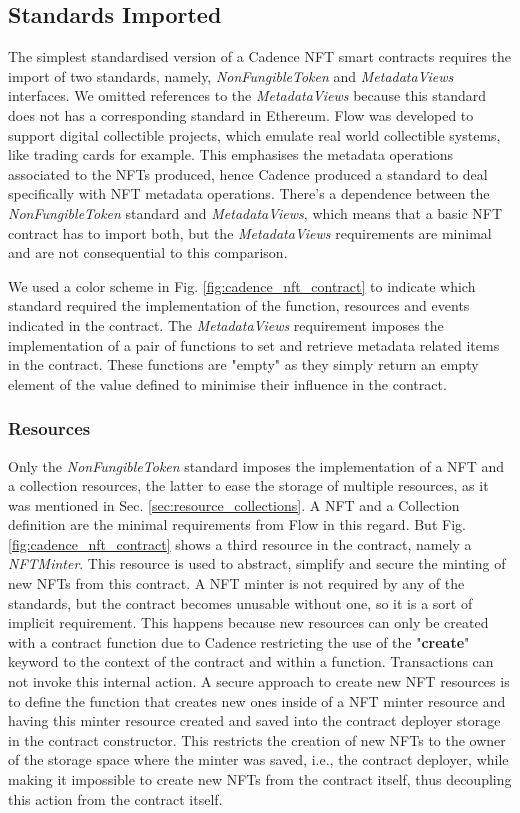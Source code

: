 \documentclass[../NFTComp_IEEE.tex]{subfiles}
\begin{document}
\subsection{Standards Imported}
The simplest standardised version of a Cadence NFT smart contracts requires the import of two standards, namely, \textit{NonFungibleToken} and \textit{MetadataViews} interfaces. We omitted references to the \textit{MetadataViews} because this standard does not has a corresponding standard in Ethereum. Flow was developed to support digital collectible projects, which emulate real world collectible systems, like trading cards for example. This emphasises the metadata operations associated to the NFTs produced, hence Cadence produced a standard to deal specifically with NFT metadata operations. There's a dependence between the \textit{NonFungibleToken} standard and \textit{MetadataViews}, which means that a basic NFT contract has to import both, but the \textit{MetadataViews} requirements are minimal and are not consequential to this comparison.
\par
We used a color scheme in Fig. \ref{fig:cadence_nft_contract} to indicate which standard required the implementation of the function, resources and events indicated in the contract. The \textit{MetadataViews} requirement imposes the implementation of a pair of functions to set and retrieve metadata related items in the contract. These functions are "empty" as they simply return an empty element of the value defined to minimise their influence in the contract.

\subsubsection{Resources}
Only the \textit{NonFungibleToken} standard imposes the implementation of a NFT and a collection resources, the latter to ease the storage of multiple resources, as it was mentioned in Sec. \ref{sec:resource_collections}. A NFT and a Collection definition are the minimal requirements from Flow in this regard. But Fig. \ref{fig:cadence_nft_contract} shows a third resource in the contract, namely a \textit{NFTMinter}. This resource is used to abstract, simplify and secure the minting of new NFTs from this contract. A NFT minter is not required by any of the standards, but the contract becomes unusable without one, so it is a sort of implicit requirement. This happens because new resources can only be created with a contract function due to Cadence restricting the use of the "\textbf{create}" keyword to the context of the contract and within a function. Transactions can not invoke this internal action. A secure approach to create new NFT resources is to define the function that creates new ones inside of a NFT minter resource and having this minter resource created and saved into the contract deployer storage in the contract constructor. This restricts the creation of new NFTs to the owner of the storage space where the minter was saved, i.e., the contract deployer, while making it impossible to create new NFTs from the contract itself, thus decoupling this action from the contract itself.
\end{document}
